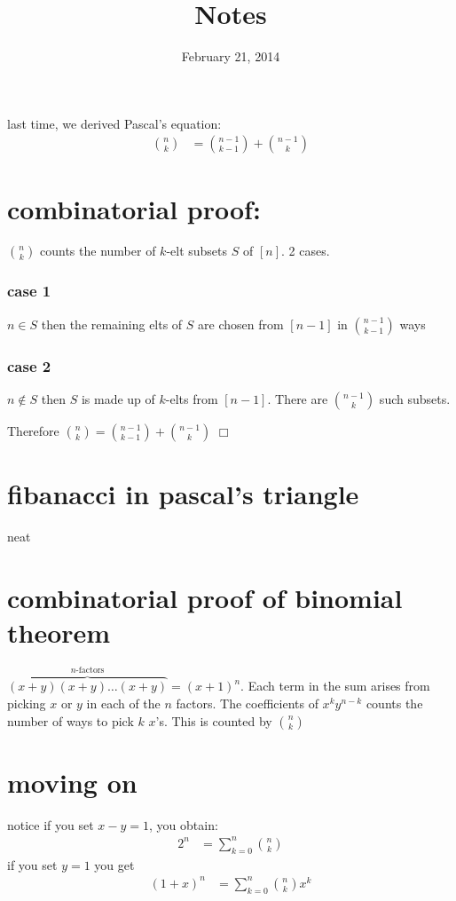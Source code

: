 \documentclass{article}
\begin{document}
\title{Notes}
\date{February 21, 2014}
\maketitle

last time, we derived Pascal's equation:
\begin{align*}
  \binom{n}{k}&=\binom{n-1}{k-1}+\binom{n-1}{k}
\end{align*}
\section*{combinatorial proof:}

$\binom{n}{k}$ counts the number of $k$-elt subsets $S$ of $[n]$. 2 cases.
\subsubsection*{case 1}
$n\in S$ then the remaining elts of $S$ are chosen from $[n-1]$ in $\binom{n-1}{k-1}$ ways
\subsubsection*{case 2}
$n\not\in S$ then $S$ is made up of $k$-elts from $[n-1]$. There are $\binom{n-1}{k}$ such subsets.

Therefore $\binom{n}{k}=\binom{n-1}{k-1}+\binom{n-1}{k}$
$\Box$

\section*{fibanacci in pascal's triangle}
neat
\section*{combinatorial proof of binomial theorem}
$\overbrace{(x+y)(x+y)\dots(x+y)}^{n\text{-factors}}=(x+1)^n$. Each term in the sum arises from picking $x$ or $y$ in each of the $n$ factors. The coefficients of $x^ky^{n-k}$ counts the number of ways to pick $k$ $x$'s. This is counted by $\binom{n}{k}$
\section*{moving on}
notice if you set $x-y=1$, you obtain:
\begin{align*}
  2^n&=\sum\limits_{k=0}^n{\binom{n}{k}}
\end{align*}
if you set $y=1$ you get
\begin{align*}
  (1+x)^n&=\sum\limits_{k=0}^n{\binom{n}{k}x^k}
\end{align*}
\end{document}
